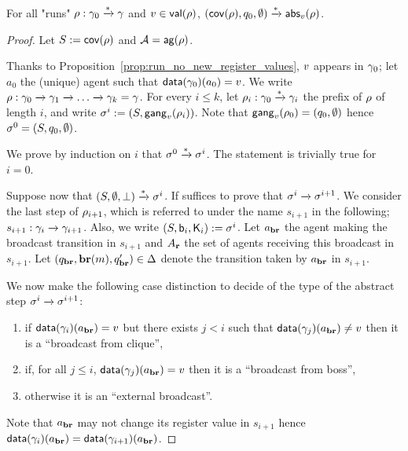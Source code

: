 \begin{lemma}
\label{lem:proof_completeness_covset_constant}
For all "runs" $\rho: \gamma_0 \xrightarrow{*} \gamma$ and $v \in \mathsf{val}(\rho)$, $(\mathsf{cov}(\rho), q_0, \emptyset) \xrightarrow{*} \mathsf{abs}_{v}(\rho)$. 
\end{lemma}
\begin{proof}
Let $S := \mathsf{cov}(\rho)$ and $\mathcal{A} = \mathsf{ag}(\rho)$.

Thanks to Proposition~\ref{prop:run_no_new_register_values},  $v$ appears in $\gamma_0$; let $a_0$ the (unique) agent such that $\mathsf{data}(\gamma_0)(a_0) = v$. We write $\rho : \gamma_0 \xrightarrow{} \gamma_1 \xrightarrow{} \dots \xrightarrow{} \gamma_k = \gamma$. For every $i \leq k$, let $\rho_i : \gamma_0 \xrightarrow{*} \gamma_i$ the prefix of $\rho$ of length $i$, and write $\sigma^i := (S, \mathsf{gang}_{v}(\rho_i))$. Note that $\mathsf{gang}_{v}(\rho_0) = (q_0, \emptyset)$ hence $\sigma^0 = (S, q_0, \emptyset)$. 

We prove by induction on $i$ that $\sigma^0 \xrightarrow{*} \sigma^i$.
The statement is trivially true for $i =0$. 

Suppose now that $(S, \emptyset, \bot) \xrightarrow{*} \sigma^i$. 
If suffices to prove that $\sigma^i \xrightarrow{} \sigma^{i+1}$. We consider the last step of $\rho_{i+1}$, which is referred to under the name $s_{i+1}$ in the following; $s_{i+1}: \gamma_i \xrightarrow{} \gamma_{i+1}$. Also, we write $(S, \mathsf{b}_i, \mathsf{K}_i) := \sigma^i$. Let $a_{\textbf{br}}$ the agent making the broadcast transition in $s_{i+1}$ and $A_{\textbf{r}}$ the set of agents receiving this broadcast in $s_{i+1}$. Let $(q_{\textbf{br}}, \textbf{br}(m), q_{\textbf{br}}') \in \Delta$ denote the transition taken by $a_{\textbf{br}}$ in $s_{i+1}$.

We now make the following case distinction to decide of the type of the abstract step $\sigma^i \xrightarrow{} \sigma^{i+1}$:
\begin{enumerate}
\item\label{proof_completeness:case_broadcast_clique} if $\mathsf{data}(\gamma_{i})(a_{\textbf{br}}) = v$ but there exists $j<i$ such that $\mathsf{data}(\gamma_{j})(a_{\textbf{br}}) \ne v$ then it is a ``broadcast from clique'',
\item\label{proof_completeness:case_broadcast_boss} if, for all $j \leq i$, $\mathsf{data}(\gamma_j)(a_{\textbf{br}}) = v$ then it is a ``broadcast from boss'',
\item\label{proof_completeness:case_external_broadcast} otherwise it is an ``external broadcast''. 
\end{enumerate}
Note that $a_{\textbf{br}}$ may not change its register value in $s_{i+1}$ hence $\mathsf{data}(\gamma_i)(a_{\textbf{br}}) = \mathsf{data}(\gamma_{i+1})(a_{\textbf{br}})$. 


\end{proof}
